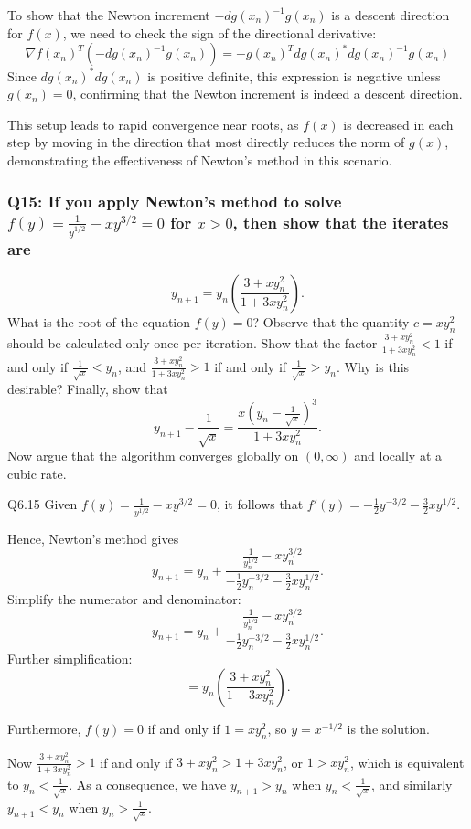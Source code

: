 \documentclass[8pt]{article}
\begin{document}
To show that the Newton increment \(- dg(x_n)^{-1} g(x_n)\) is a descent direction for \( f(x) \), we need to check the sign of the directional derivative:
\[
\nabla f(x_n)^T (- dg(x_n)^{-1} g(x_n)) = - g(x_n)^T dg(x_n)^* dg(x_n)^{-1} g(x_n)
\]
Since \( dg(x_n)^* dg(x_n) \) is positive definite, this expression is negative unless \( g(x_n) = 0 \), confirming that the Newton increment is indeed a descent direction.

This setup leads to rapid convergence near roots, as \( f(x) \) is decreased in each step by moving in the direction that most directly reduces the norm of \( g(x) \), demonstrating the effectiveness of Newton's method in this scenario.

\subsubsection*{Q15: If you apply Newton’s method to solve \( f(y) = \frac{1}{y^{1/2}} - xy^{3/2} = 0 \) for \( x > 0 \), then show that the iterates are}
\[
y_{n+1} = y_n \left( \frac{3 + xy_n^2}{1 + 3xy_n^2} \right).
\]
What is the root of the equation \( f(y) = 0 \)? Observe that the quantity \( c = xy_n^2 \) should be calculated only once per iteration. Show that the factor \(\frac{3 + xy_n^2}{1 + 3xy_n^2} < 1 \) if and only if \(\frac{1}{\sqrt{x}} < y_n\), and \(\frac{3 + xy_n^2}{1 + 3xy_n^2} > 1 \) if and only if \(\frac{1}{\sqrt{x}} > y_n\). Why is this desirable? Finally, show that
\[
y_{n+1} - \frac{1}{\sqrt{x}} = \frac{x \left( y_n - \frac{1}{\sqrt{x}} \right)^3}{1 + 3xy_n^2}.
\]
Now argue that the algorithm converges globally on \( (0, \infty) \) and locally at a cubic rate.

Q6.15 Given \( f(y) = \frac{1}{y^{1/2}} - xy^{3/2} = 0 \), it follows that \( f'(y) = -\frac{1}{2}y^{-3/2} - \frac{3}{2}xy^{1/2} \).

Hence, Newton’s method gives
\[
y_{n+1} = y_n + \frac{\frac{1}{y_n^{1/2}} - xy_n^{3/2}}{-\frac{1}{2}y_n^{-3/2} - \frac{3}{2}xy_n^{1/2}}.
\]
Simplify the numerator and denominator:
\[
y_{n+1} = y_n + \frac{\frac{1}{y_n^{1/2}} - xy_n^{3/2}}{-\frac{1}{2}y_n^{-3/2} - \frac{3}{2}xy_n^{1/2}}.
\]
Further simplification:
\[
= y_n \left( \frac{3 + xy_n^2}{1 + 3xy_n^2} \right).
\]

Furthermore, \( f(y) = 0 \) if and only if \( 1 = xy_n^2 \), so \( y = x^{-1/2} \) is the solution.

Now \( \frac{3 + xy_n^2}{1 + 3xy_n^2} > 1 \) if and only if \( 3 + xy_n^2 > 1 + 3xy_n^2 \), or \( 1 > xy_n^2 \), which is equivalent to \( y_n < \frac{1}{\sqrt{x}} \). As a consequence, we have \( y_{n+1} > y_n \) when \( y_n < \frac{1}{\sqrt{x}} \), and similarly \( y_{n+1} < y_n \) when \( y_n > \frac{1}{\sqrt{x}} \).
\end{document}
